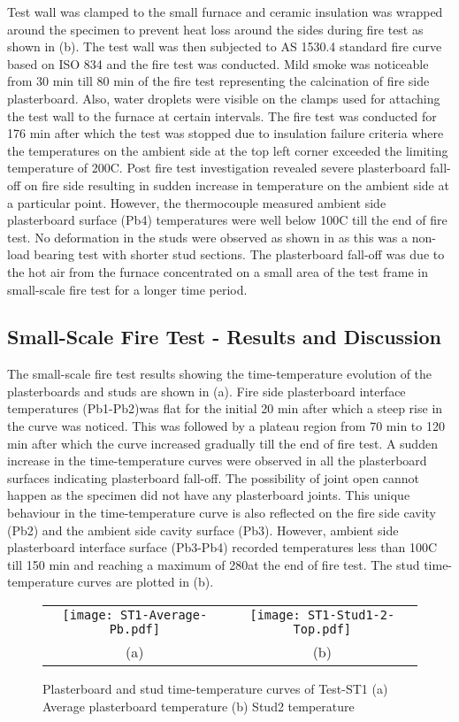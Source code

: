 Test wall was clamped to the small furnace and ceramic insulation was wrapped around the specimen to prevent heat loss around the sides during fire test as shown in (b). The test wall was then subjected to AS 1530.4 standard fire curve based on ISO 834 and the fire test was conducted. Mild smoke was noticeable from 30 min till 80 min of the fire test representing the calcination of fire side plasterboard. Also, water droplets were visible on the clamps used for attaching the test wall to the furnace at certain intervals. The fire test was conducted for 176 min after which the test was stopped due to insulation failure criteria where the temperatures on the ambient side at the top left corner exceeded the limiting temperature of 200\degree C. Post fire test investigation revealed severe plasterboard fall-off on fire side resulting in sudden increase in temperature on the ambient side at a particular point. However, the thermocouple measured ambient side plasterboard surface (Pb4) temperatures were well below 100\degree C till the end of fire test. No deformation in the studs were observed as shown in  as this was a non-load bearing test with shorter stud sections. The plasterboard fall-off was due to the hot air from the furnace concentrated on a small area of the test frame in small-scale fire test for a longer time period.

\subsection{Small-Scale Fire Test - Results and Discussion}

The small-scale fire test results showing the time-temperature evolution of the plasterboards and studs are shown in (a). Fire side plasterboard interface temperatures (Pb1-Pb2)was flat for the initial 20 min after which a steep rise in the curve was noticed. This was followed by a plateau region from 70 min to 120 min after which the curve increased gradually till the end of fire test. A sudden increase in the time-temperature curves were observed in all the plasterboard surfaces indicating plasterboard fall-off. The possibility of joint open cannot happen as the specimen did not have any plasterboard joints. This unique behaviour in the time-temperature curve is also reflected on the fire side cavity (Pb2) and the ambient side cavity surface (Pb3). However, ambient side plasterboard interface surface (Pb3-Pb4) recorded temperatures less than 100\degree C till 150 min and reaching a maximum of 280\degree at the end of fire test. The stud time-temperature curves are plotted in (b).  
\begin{figure}[!htbp]
	\centering
		\begin{tabular}{cc}
			\texttt{[image: ST1-Average-Pb.pdf]} & \texttt{[image: ST1-Stud1-2-Top.pdf]} \\ 
			(a) & (b)  \\ 
		\end{tabular} 
		\caption{Plasterboard and stud time-temperature curves of Test-ST1 (a) Average plasterboard temperature (b) Stud2 temperature}
		\label{fig:ST1-PB&Stud}
\end{figure}


